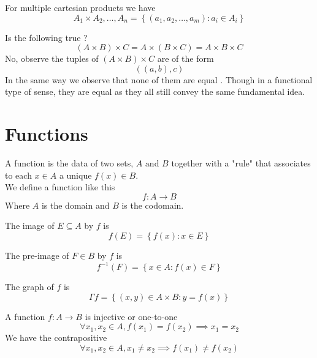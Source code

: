\documentclass[11pt]{book}
\begin{document}
For multiple cartesian products we have
\[
    A_{1} \times A_{2} , \ldots , A_{n} = \left\{ \left( a_1, a_2, \ldots , a_{m}  \right) : a_{i} \in A_{i}  \right\} 
\]

\begin{ex}
    Is the following true ?
    \[
        \left( A\times B \right) \times C = A\times \left( B\times C \right) = A\times B\times C
    \]
    No, observe the tuples of $\left( A\times B \right) \times C$ are of the form
    \[
        \left( \left( a,b \right) ,c \right) 
    \]
    In the same way we observe that none of them are equal . Though in a functional type of sense, they are equal as they all still convey the same fundamental idea.
\end{ex}

\section{Functions}%
\label{sec:functions}

\begin{defn}[Function]\label{defn:function}
    A function is the data of two sets, $A \text{ and } B$ together with a "rule" that associates to each $x\in A$ a unique $f\left(x\right) \in B$. \\
    We define a function like this
    \[
    f : A \to B 
    \]
    Where $A$  is the domain and $B$ is the codomain.
\end{defn}

\begin{defn}[Image]\label{defn:image}
    The image of $E \subseteq A$ by $f$ is
    \[
    f\left(E\right) = \left\{ f\left(x\right) : x\in E \right\} 
    \]
\end{defn}

\begin{defn}\label{defn:pre_image}
    The pre-image of $F\in B$ by $f$ is
    \[
    f^{-1} \left(F\right) = \left\{ x\in A: f\left(x\right) \in F \right\} 
    \]
\end{defn}

\begin{defn}[Graph]\label{defn:graph}
    The graph of $f$ is 
    \[
        \Gamma f = \left\{ \left( x,y \right) \in A\times B:y = f\left(x\right)  \right\} 
    \]
\end{defn}

\begin{defn}[Injective]\label{defn:injective}
    A function $f : A \to B $ is injective or one-to-one 
    \[
    \forall x_1,x_2 \in A, f\left(x_1\right) = f\left(x_2\right) \implies x_1= x_2
    \]
    We have the contrapositive 
    \[
    \forall x_1,x_2 \in A, x_1 \neq x_2 \implies f\left(x_1\right) \neq f\left(x_2\right) 
    \]
\end{defn}
\end{document}
